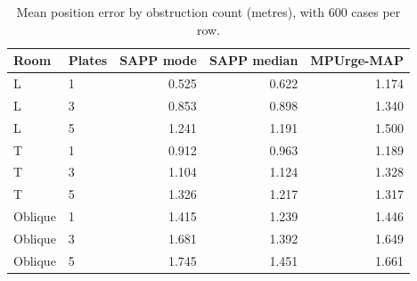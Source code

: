 \begin{table}[H]
\centering
\caption{Mean position error by obstruction count (metres), with 600 cases per row.}
\label{tab:objects}
\setlength{\tabcolsep}{4pt}
\begin{tabular}{llrrr}
\toprule
Room & Plates & SAPP mode & SAPP median & MPUrge-MAP\\
\midrule
L & 1 & 0.525 & 0.622 & 1.174\\
L & 3 & 0.853 & 0.898 & 1.340\\
L & 5 & 1.241 & 1.191 & 1.500\\
T & 1 & 0.912 & 0.963 & 1.189\\
T & 3 & 1.104 & 1.124 & 1.328\\
T & 5 & 1.326 & 1.217 & 1.317\\
Oblique & 1 & 1.415 & 1.239 & 1.446\\
Oblique & 3 & 1.681 & 1.392 & 1.649\\
Oblique & 5 & 1.745 & 1.451 & 1.661\\
\bottomrule
\end{tabular}
\end{table}
